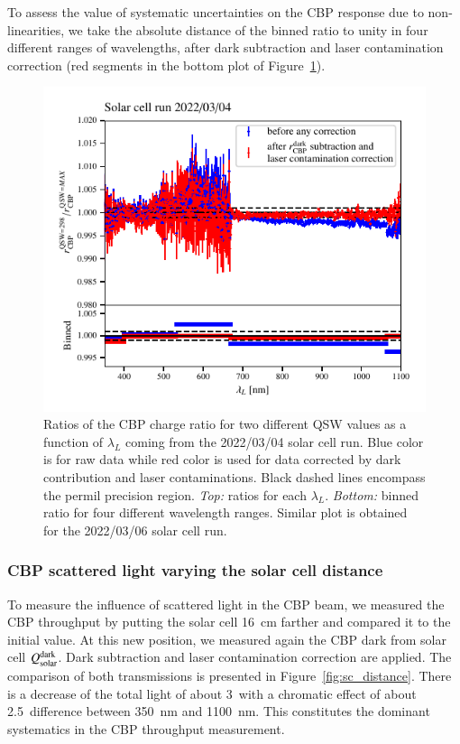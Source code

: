 To assess the value of systematic uncertainties on the CBP response due to non-linearities, we take the absolute distance of the binned ratio to unity in four different ranges of wavelengths, after dark subtraction and laser contamination correction (red segments in the bottom plot of Figure~\ref{fig:SCqswlinearity}).

\begin{figure}[h]
    \centering
    \includegraphics[width=\columnwidth]{fig/sc_qsw_ratios.pdf}
    \caption{Ratios of the CBP charge ratio for two different QSW values as a function of $\lambda_L$ coming from the 2022/03/04 solar cell run. Blue color is for raw data while red color is used for data corrected by dark contribution and laser contaminations. Black dashed lines encompass the permil precision region. \textit{Top:} ratios for each $\lambda_L$. \textit{Bottom:} binned ratio for four different wavelength ranges. Similar plot is obtained for the 2022/03/06 solar cell run.}
    \label{fig:SCqswlinearity}    
\end{figure}


\subsubsection{CBP scattered light varying the solar cell distance}

To measure the influence of scattered light in the CBP beam, we measured the CBP throughput by putting the solar cell \SI{16}{\cm} farther and compared it to the initial value. At this new position, we measured again the CBP dark from solar cell $Q_{\mathrm{solar}}^{\rm dark}$. Dark subtraction and laser contamination correction are applied. The comparison of both transmissions is presented in Figure~\ref{fig:sc_distance}. There is a decrease of the total light of about 3\textperthousand\ with a chromatic effect of about 2.5\textperthousand\ difference between \SI{350}{\nm} and \SI{1100}{\nm}. This constitutes the dominant systematics in the CBP throughput measurement.

